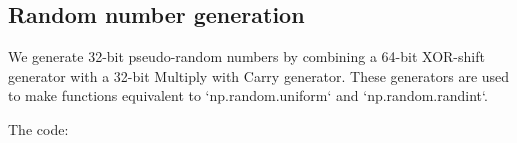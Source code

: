 \subsection{Random number generation}

We generate 32-bit pseudo-random numbers by combining a 64-bit XOR-shift generator with a 
32-bit Multiply with Carry generator. These generators are used to make functions equivalent 
to `np.random.uniform` and `np.random.randint`.

\noindent The code:
